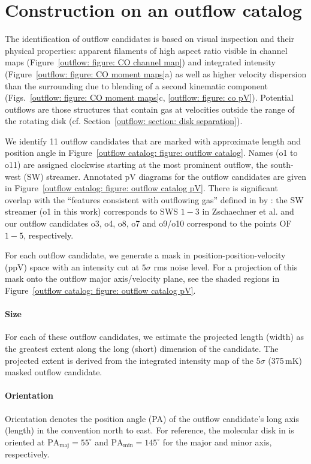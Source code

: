 \section{Construction on an outflow catalog}\label{outflow catalog: section: construction}

The identification of outflow candidates is based on visual inspection and their physical properties:
apparent filaments of high aspect ratio visible in channel maps (Figure~\ref{outflow: figure: CO channel map}) and integrated intensity (Figure~\ref{outflow: figure: CO moment maps}a) as well as higher velocity dispersion than the surrounding due to blending of a second kinematic component (Figs.~\ref{outflow: figure: CO moment maps}c, \ref{outflow: figure: co pV}). Potential outflows are those structures that contain gas at velocities outside the range of the rotating disk (cf. Section~\ref{outflow: section: disk separation}).

We identify 11 outflow candidates that are marked with approximate length and position angle in Figure~\ref{outflow catalog: figure: outflow catalog}. Names (o1 to o11) are assigned clockwise starting at the most prominent outflow, the south-west (SW) streamer. Annotated pV diagrams for the outflow candidates are given in Figure~\ref{outflow catalog: figure: outflow catalog pV}.
There is significant overlap with the ``features consistent with outflowing gas'' defined in  by \citet{2018ApJ...867..111Z}: the SW streamer (o1 in this work) corresponds to SWS $1-3$ in Zschaechner et al. and our outflow candidates o3, o4, o8, o7 and o9/o10 correspond to the points OF$1-5$, respectively.

For each outflow candidate, we generate a mask in position-position-velocity (ppV) space with an intensity cut at $5\sigma$ rms noise level. For a projection of this mask onto the outflow major axis/velocity plane, see the shaded regions in Figure~\ref{outflow catalog: figure: outflow catalog pV}.


\paragraph{Size}
For each of these outflow candidates, we estimate the projected length (width) as the greatest extent along the long (short) dimension of the candidate. The projected extent is derived from the integrated intensity map of the $5\sigma$ (375\,mK) masked outflow candidate.

\paragraph{Orientation}
Orientation denotes the position angle (PA) of the outflow candidate's long axis (length) in the convention north to east. For reference, the molecular disk in  is oriented at $\mathrm{PA_{maj}} = 55^\circ$ and $\mathrm{PA_{min}} = 145^\circ$ for the major and minor axis, respectively.

